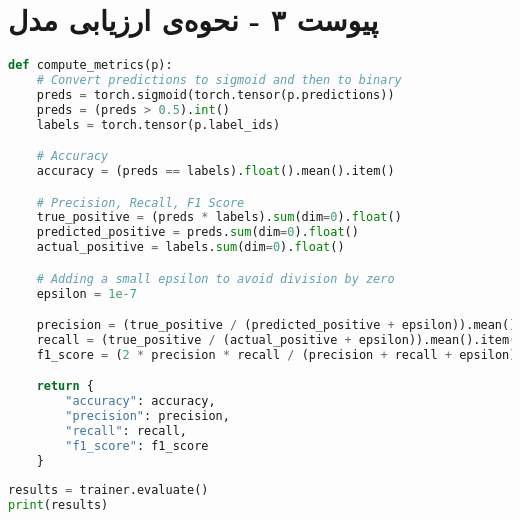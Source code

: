 \chapter*{پیوست ۳ - نحوه‌ی ارزیابی مدل}
\label{appendix:3}
\begin{latin}
\begin{lstlisting}[language=Python, title=\rl{تابع بدست آوردن معیار های ارزیابی از روی خروجی مدل و برچسب های داده}]
def compute_metrics(p):
    # Convert predictions to sigmoid and then to binary
    preds = torch.sigmoid(torch.tensor(p.predictions))
    preds = (preds > 0.5).int()
    labels = torch.tensor(p.label_ids)

    # Accuracy
    accuracy = (preds == labels).float().mean().item()

    # Precision, Recall, F1 Score
    true_positive = (preds * labels).sum(dim=0).float()
    predicted_positive = preds.sum(dim=0).float()
    actual_positive = labels.sum(dim=0).float()

    # Adding a small epsilon to avoid division by zero
    epsilon = 1e-7

    precision = (true_positive / (predicted_positive + epsilon)).mean().item()
    recall = (true_positive / (actual_positive + epsilon)).mean().item()
    f1_score = (2 * precision * recall / (precision + recall + epsilon))

    return {
        "accuracy": accuracy,
        "precision": precision,
        "recall": recall,
        "f1_score": f1_score
    }
\end{lstlisting}
\end{latin}

\begin{latin}
\begin{lstlisting}[language=Python, title=\rl{ارزیابی مدل با استفاده از تابع ارزیابی تعریف شده}]
results = trainer.evaluate()
print(results)
\end{lstlisting}
\end{latin}
\clearpage